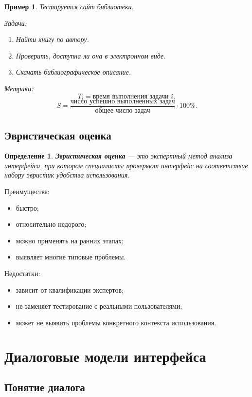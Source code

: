 \documentclass[12pt,a4paper]{article}
\newtheorem{definition}{Определение}
\newtheorem{example}{Пример}
\begin{document}
\begin{example}
Тестируется сайт библиотеки.

Задачи:
\begin{enumerate}
    \item Найти книгу по автору.
    \item Проверить, доступна ли она в электронном виде.
    \item Скачать библиографическое описание.
\end{enumerate}

Метрики:
\[
T_i = \text{время выполнения задачи } i,
\]
\[
S = \frac{\text{число успешно выполненных задач}}{\text{общее число задач}} \cdot 100\%.
\]
\end{example}

\subsection{Эвристическая оценка}

\begin{definition}
\textbf{Эвристическая оценка} --- это экспертный метод анализа интерфейса, при котором специалисты проверяют интерфейс на соответствие набору эвристик удобства использования.
\end{definition}

Преимущества:
\begin{itemize}
    \item быстро;
    \item относительно недорого;
    \item можно применять на ранних этапах;
    \item выявляет многие типовые проблемы.
\end{itemize}

Недостатки:
\begin{itemize}
    \item зависит от квалификации экспертов;
    \item не заменяет тестирование с реальными пользователями;
    \item может не выявить проблемы конкретного контекста использования.
\end{itemize}

\section{Диалоговые модели интерфейса}

\subsection{Понятие диалога}
\end{document}
